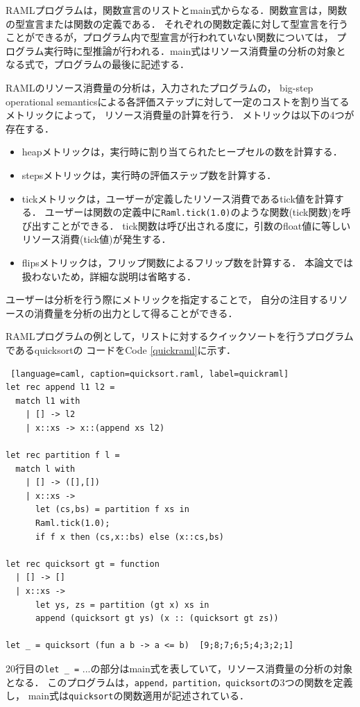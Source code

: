 \documentclass{kuisthesis}
\begin{document}
RAMLプログラムは，関数宣言のリストとmain式からなる．関数宣言は，関数の型宣言または関数の定義である．
それぞれの関数定義に対して型宣言を行うことができるが，プログラム内で型宣言が行われていない関数については，
プログラム実行時に型推論が行われる．main式はリソース消費量の分析の対象となる式で，プログラムの最後に記述する．


RAMLのリソース消費量の分析は，入力されたプログラムの，
big-step operational semanticsによる各評価ステップに対して一定のコストを割り当てるメトリックによって\cite{raml}，
リソース消費量の計算を行う．
メトリックは以下の4つが存在する．
\begin{itemize}
  \item heapメトリックは，実行時に割り当てられたヒープセルの数を計算する．
  \item stepsメトリックは，実行時の評価ステップ数を計算する．
  \item tickメトリックは，ユーザーが定義したリソース消費であるtick値を計算する．
  ユーザーは関数の定義中に{\tt Raml.tick(1.0)}のような関数(tick関数)を呼び出すことができる．
  tick関数は呼び出される度に，引数のfloat値に等しいリソース消費(tick値)が発生する．
  \item flipsメトリックは，フリップ関数によるフリップ数を計算する．
  本論文では扱わないため，詳細な説明は省略する．
\end{itemize}

ユーザーは分析を行う際にメトリックを指定することで，
自分の注目するリソースの消費量を分析の出力として得ることができる．

RAMLプログラムの例として，リストに対するクイックソートを行うプログラムであるquicksortの
コードをCode \ref{quickraml}に示す．

\begin{lstlisting} [language=caml, caption=quicksort.raml, label=quickraml]
let rec append l1 l2 =
  match l1 with
    | [] -> l2
    | x::xs -> x::(append xs l2)

let rec partition f l =
  match l with
    | [] -> ([],[])
    | x::xs ->
      let (cs,bs) = partition f xs in
      Raml.tick(1.0);
      if f x then (cs,x::bs) else (x::cs,bs)

let rec quicksort gt = function
  | [] -> []
  | x::xs ->
      let ys, zs = partition (gt x) xs in
      append (quicksort gt ys) (x :: (quicksort gt zs))

let _ = quicksort (fun a b -> a <= b)  [9;8;7;6;5;4;3;2;1]
\end{lstlisting}

20行目の{\tt let \_ =} ...の部分はmain式を表していて，リソース消費量の分析の対象となる．
このプログラムは，{\tt append，partition，quicksort}の3つの関数を定義し，
main式は{\tt quicksort}の関数適用が記述されている．
\end{document}
